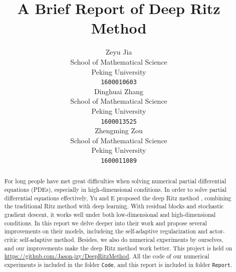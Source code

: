 \documentclass{article}
\title{A Brief Report of Deep Ritz Method}
\author{
  Zeyu Jia\\School of Mathematical Science\\Peking University\\ \texttt{1600010603} \\
  \And
  Dinghuai Zhang\\School of Mathematical Science\\Peking University\\ \texttt{1600013525}\\
  \And
  Zhengming Zou\\School of Mathematical Science\\Peking University \\ \texttt{1600011089}
}
\begin{document}
\maketitle

\begin{abstract}
\par For long people have met great difficulties when solving numerical partial differential equations (PDEs), especially in high-dimensional conditions. In order to solve partial differential equations effectively, Yu and E proposed the deep Ritz method \cite{yu2017deep}, combining the traditional Ritz method with deep learning. With residual blocks and stochastic gradient descent, it works well under both low-dimensional and high-dimensional conditions. In this report we delve deeper into their work and propose several improvements on their models, includeing the self-adaptive regularization and actor-critic self-adaptive method. Besides, we also do numerical experiments by ourselves, and our improvements make the deep Ritz method work better. This project is held on \url{https://github.com/Jason-jzy/DeepRitzMethod}. All the code of our numerical experiments is included in the folder \verb"Code", and this report is included in folder \verb"Report".
\end{abstract}
\end{document}
